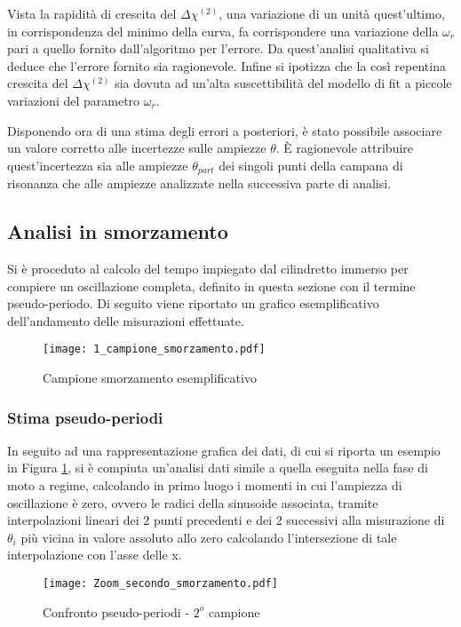 \documentclass[a4paper,11pt,oneside]{article}
\begin{document}
Vista la rapidità di crescita del $\Delta\chi^{(2)}$, una variazione di un unità  quest'ultimo, in corrispondenza del minimo della curva, fa corrispondere una variazione della $\omega_{r}$ pari a quello fornito dall'algoritmo per l'errore.
Da quest'analisi qualitativa si deduce che l'errore fornito sia ragionevole.
Infine si ipotizza che la così repentina crescita del $\Delta \chi^{(2)}$ sia dovuta ad un'alta suscettibilità del modello di fit a piccole variazioni del parametro $\omega_{r}$.

Disponendo ora di una stima degli errori a posteriori, è stato possibile associare un valore corretto alle incertezze sulle ampiezze $\theta$. È ragionevole attribuire quest'incertezza sia alle ampiezze $\theta_{part}$ dei singoli punti della campana di risonanza che alle ampiezze analizzate nella successiva parte di analisi.

\subsection{Analisi in smorzamento}
Si è proceduto al calcolo del tempo impiegato dal cilindretto immerso per compiere un oscillazione completa, definito in questa sezione con il termine pseudo-periodo. Di seguito viene riportato un grafico esemplificativo dell'andamento delle misurazioni effettuate.

\begin{figure}[h!]
    \centering
    \texttt{[image: 1\_campione\_smorzamento.pdf]}
    \caption{Campione smorzamento esemplificativo}
    \label{fig:campione_smorzamento_esemplificativo}
\end{figure}

\subsubsection{Stima pseudo-periodi}
In seguito ad una rappresentazione grafica dei dati, di cui si riporta un esempio in Figura \ref{fig:campione_smorzamento_esemplificativo}, si è compiuta un'analisi dati simile a quella eseguita nella fase di moto a regime, calcolando in primo luogo i momenti in cui l'ampiezza di oscillazione è zero, ovvero le radici della sinusoide associata, tramite interpolazioni lineari dei 2 punti precedenti e dei 2 successivi alla misurazione di $\theta_i$ più vicina in valore assoluto allo zero calcolando l'intersezione di tale interpolazione con l'asse delle x.

\begin{wrapfigure}{r}{8cm}
    \centering
    \texttt{[image: Zoom\_secondo\_smorzamento.pdf]}
    \caption{Confronto pseudo-periodi - $2^o$ campione}
    \label{fig:zoom_secondo_smorzamento}
\end{wrapfigure}
\end{document}
